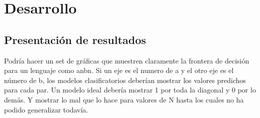 
\chapter{Desarrollo}
\label{desarrollo}

\section{Presentación de resultados}

Podría hacer un set de gráficas que muestren claramente la frontera de decisión para un lenguaje como 
anbn. Si un eje es el numero de a y el otro eje es el número de b, los modelos clasificatorios
deberían mostrar los valores predichos para cada par. Un modelo ideal debería mostrar 1 por toda la diagonal
y 0 por lo demás. Y mostrar lo mal que lo hace para valores de N hasta los cuales no ha podido generalizar 
todavía.
